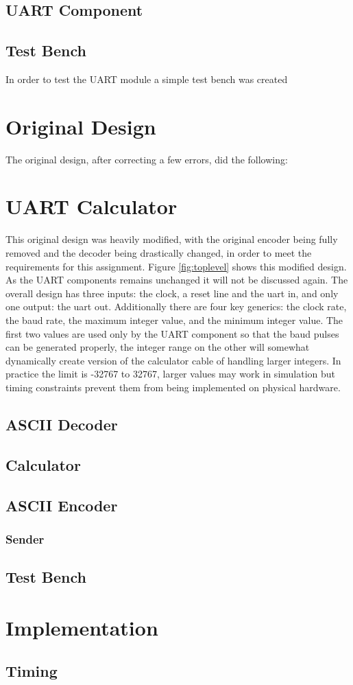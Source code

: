 \documentclass[11pt]{article}
\begin{document}
\subsection{UART Component}



\subsection{Test Bench}
In order to test the UART module a simple test bench was created

\section{Original Design}
The original design, after correcting a few errors, did the following:

\section{UART Calculator}
This original design was heavily modified, with the original encoder being fully removed and the decoder being drastically changed, in order to meet the requirements for this assignment.
Figure \ref{fig:toplevel} shows this modified design.
As the UART components remains unchanged it will not be discussed again.
The overall design has three inputs: the clock, a reset line and the uart in, and only one output: the uart out.
Additionally there are four key generics: the clock rate, the baud rate, the maximum integer value, and the minimum integer value.
The first two values are used only by the UART component so that the baud pulses can be generated properly,
the integer range on the other will somewhat dynamically create version of the calculator cable of handling larger integers.
In practice the limit is -32767 to 32767, larger values may work in simulation but timing constraints prevent them from being implemented on physical hardware.


\subsection{ASCII Decoder}

\subsection{Calculator}
\subsection{ASCII Encoder}
\subsubsection{Sender}

\subsection{Test Bench}

\section{Implementation}
\subsection{Timing}

\pagebreak
\printbibliography
\end{document}
